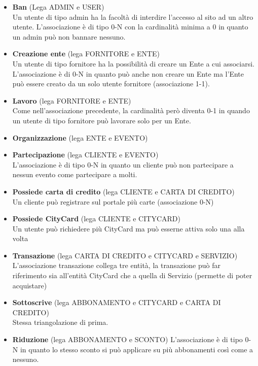 \begin{itemize}
    \item 
    \textbf{Ban} (Lega ADMIN e USER)\\
    Un utente di tipo admin ha la facoltà di interdire l'accesso al sito
    ad un altro utente. L'associazione è di tipo 0-N
    con la cardinalità minima a 0 in quanto un admin può non bannare nessuno.
    \item 
    \textbf{Creazione ente} (lega FORNITORE e ENTE)\\
    Un utente di tipo fornitore ha la possibilità di creare un Ente a cui associarsi.
    L'associazione è di 0-N in quanto può anche non creare un Ente ma l'Ente può essere creato da un solo utente fornitore (associazione 1-1).
    \item 
    \textbf{Lavoro} (lega FORNITORE e ENTE)\\
    Come nell'associazione precedente, la cardinalità però diventa 0-1 in quando un utente di tipo fornitore può lavorare solo per un Ente.
    \item 
    \textbf{Organizzazione} (lega ENTE e EVENTO)\\
    \item 
    \textbf{Partecipazione} (lega CLIENTE e EVENTO)\\
    L'associazione è di tipo 0-N in quanto un cliente può non partecipare a nessun evento come partecipare a molti.
    \item 
    \textbf{Possiede carta di credito} (lega  CLIENTE e CARTA DI CREDITO)\\
    Un cliente può registrare sul portale più carte (associazione 0-N)
    \item 
    \textbf{Possiede CityCard} (lega CLIENTE e CITYCARD)\\
    Un utente può richiedere più CityCard ma può esserne attiva solo una alla volta
    \item 
    \textbf{Transazione} (lega CARTA DI CREDITO e CITYCARD e SERVIZIO)\\
    L'associazione transazione collega tre entità, la transazione può far riferimento sia all'entità CityCard che a quella di Servizio (permette di poter acquistare)
    \item 
    \textbf{Sottoscrive} (lega ABBONAMENTO e CITYCARD e CARTA DI CREDITO) \\
    Stessa triangolazione di prima.
    \item 
    \textbf{Riduzione} (lega ABBONAMENTO e SCONTO)
    L'associazione è di tipo 0-N in quanto lo stesso sconto si può applicare su più abbonamenti così come a nessuno.
\end{itemize}